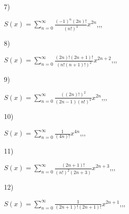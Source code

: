 \documentclass[11pt, ukrainian]{article}
\begin{document}
\par
\vspace{0.9cm}
7) \space 
{%
{$S(x)=\sum\limits_{n=0}^{\infty}{\frac{{(-1)^n}(2n)!}{(n!)^4}}{x^{{2n}}}$},,, \par \smallskip  
}
\par
\vspace{0.9cm}
8) \space 
{%
{$S(x)=\sum\limits_{n=0}^{\infty}{\frac{(2n)!(2n+1)!}{(n!(n+1)!)^2}}{x^{{2n+2}}}$},,, \par \smallskip  
}
\par
\vspace{0.9cm}
9) \space 
{%
{$S(x)=\sum\limits_{n=0}^{\infty}{\frac{((2n)!)^2}{(2n-1)(n!)^4}}{x^{{2n}}}$},,, \par \smallskip  
}
\par
\vspace{0.9cm}
10) \space 
{%
{$S(x)=\sum\limits_{n=0}^{\infty}{\frac{1}{(4n)!}}{x^{{4n}}}$},,, \par \smallskip  
}
\par
\newpage
11) \space 
{%
{$S(x)=\sum\limits_{n=0}^{\infty}{\frac{(2n+1)!}{(n!)^2(2n+3)}}{x^{{2n+3}}}$},,, \par \smallskip  
}
\par
\vspace{0.9cm}
12) \space 
{%
{$S(x)=\sum\limits_{n=0}^{\infty}{\frac{1}{(2n+1)!(2n+1)!}}{x^{{2n+1}}}$},,, \par \smallskip  
}
\end{document}
